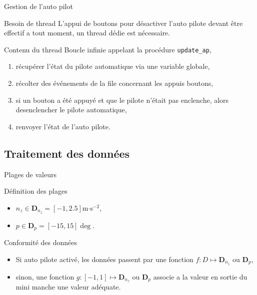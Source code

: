 \documentclass[footheight=2em]{beamer}
\begin{document}
\begin{frame}[t]{Gestion de l'auto pilot}
  \begin{block}{Besoin de thread}
    L'appui de boutons pour désactiver l'auto pilote devant être effectif a tout
    moment, un thread dédie est nécessaire.
  \end{block}
  \begin{block}{Contenu du thread}
    Boucle infinie appelant la procédure \texttt{update\_ap},
    \begin{enumerate}
      \item récupérer l'état du pilote automatique via une variable
        globale,
      \item récolter des événements de la file concernant les appuis boutons,
      \item si un bouton a été appuyé et que le pilote n'était pas enclenche,
        alors desenclencher le pilote automatique,
      \item renvoyer l'état de l'auto pilote.
    \end{enumerate}
  \end{block}
\end{frame}

\subsection{Traitement des données}
\begin{frame}[t]{Plages de valeurs}
  \begin{block}{Définition des plages}
    \begin{itemize}
      \item \(n_z \in \mathbf{D}_{n_z} = [-1, 2.5]\)m\(\cdot\)s\(^{-2}\),
      \item \(p \in \mathbf{D}_p = [-15, 15]\deg\).
    \end{itemize}
  \end{block}
  \begin{block}{Conformité des données}
    \begin{itemize}
      \item Si auto pilote activé, les données passent par une
        fonction \(f\colon D \mapsto \mathbf{D}_{n_z}\) ou \(\mathbf{D}_p\),
      \item sinon, une fonction \(g\colon[-1, 1] \mapsto \mathbf{D}_{n_z}\) ou
        \(\mathbf{D}_p\) associe a la valeur en sortie du mini manche une valeur
        adéquate.
    \end{itemize}
  \end{block}
\end{frame}
\end{document}
